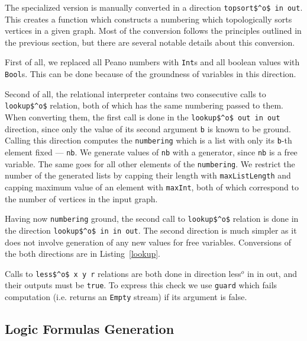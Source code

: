 



The specialized version is manually converted in a direction \lstinline{topsort$^o$ in out}.
This creates a function which constructs a numbering which topologically sorts vertices in a given graph.
Most of the conversion follows the principles outlined in the previous section, but there are several notable details about this conversion.

First of all, we replaced all Peano numbers with \lstinline{Int}s and all \mk boolean values with \lstinline{Bool}s.
This can be done because of the groundness of variables in this direction.

Second of all, the relational interpreter contains two consecutive calls to \lstinline{lookup$^o$} relation, both of which has the same numbering passed to them.
When converting them, the first call is done in the \lstinline{lookup$^o$ out in out} direction, since only the value of its second argument \lstinline{b} is known to be ground.
Calling this direction computes the \lstinline{numbering} which is a list with only its \lstinline{b}-th element fixed --- \lstinline{nb}.
We generate values of \lstinline{nb} with a generator, since \lstinline{nb} is a free variable.
The same goes for all other elements of the \lstinline{numbering}.
We restrict the number of the generated lists by capping their length with \lstinline{maxListLength} and capping maximum value of an element with \lstinline{maxInt}, both of which correspond to the number of vertices in the input graph.

Having now \lstinline{numbering} ground, the second call to \lstinline{lookup$^o$} relation is done in the direction \lstinline{lookup$^o$ in in out}.
The second direction is much simpler as it does not involve generation of any new values for free variables.
Conversions of the both directions are in Listing~\ref{lookup}.

Calls to \lstinline{less$^o$ x y r} relations are both done in direction {less$^o$ in in out}, and their outputs must be \lstinline{true}.
To express this check we use \lstinline{guard} which fails computation (i.e. returns an \lstinline{Empty} stream) if its argument is false.

\subsection{Logic Formulas Generation}

